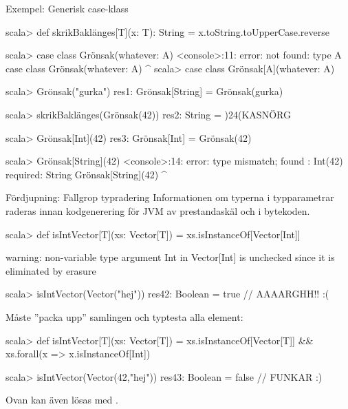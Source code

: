 \begin{Slide}{Exempel: Generisk case-klass}
\vspace{-0.5em}\begin{REPL}
scala> def skrikBaklänges[T](x: T): String = x.toString.toUpperCase.reverse

scala> case class Grönsak(whatever: A)
<console>:11: error: not found: type A
       case class Grönsak(whatever: A)
                                    ^
scala> case class Grönsak[A](whatever: A)

scala> Grönsak("gurka")
res1: Grönsak[String] = Grönsak(gurka)

scala> skrikBaklänges(Grönsak(42))
res2: String = )24(KASNÖRG

scala> Grönsak[Int](42)
res3: Grönsak[Int] = Grönsak(42)

scala> Grönsak[String](42)
<console>:14: error: type mismatch;
 found   : Int(42)
 required: String
       Grönsak[String](42)
                       ^
\end{REPL}
\end{Slide}




\ifkompendium\else


\begin{Slide}{Fördjupning: Fallgrop typradering }\SlideFontSmall
Informationen om typerna i typparametrar raderas innan kodgenerering för JVM av prestandaskäl och  i bytekoden.
\vspace{-0.25em}\begin{REPL}
scala> def isIntVector[T](xs: Vector[T]) = xs.isInstanceOf[Vector[Int]]

warning: non-variable type argument Int in Vector[Int]
is unchecked since it is eliminated by erasure

scala> isIntVector(Vector("hej"))
res42: Boolean = true  // AAAARGHH!! :(
\end{REPL}
Måste ''packa upp'' samlingen och typtesta alla element:
\begin{REPL}
scala> def isIntVector[T](xs: Vector[T]) =
         xs.isInstanceOf[Vector[T]] && xs.forall(x => x.isInstanceOf[Int])

scala> isIntVector(Vector(42,"hej"))
res43: Boolean = false  // FUNKAR :)

\end{REPL}
Ovan kan även lösas med .

\end{Slide}



